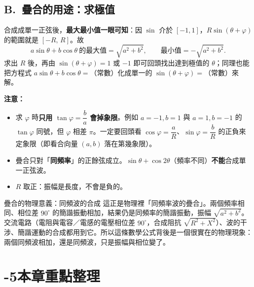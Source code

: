 \documentclass[11pt]{article}
\begin{document}
\subsection*{\sffamily B.\ 疊合的用途：求極值}

合成成單一正弦後，\textbf{最大最小值一眼可知}：因 $\sin$ 介於 $[-1,1]$，$R\sin(\theta+\varphi)$ 的範圍就是 $[-R,\,R]$。故
$$a\sin\theta+b\cos\theta\ \text{的最大值}=\sqrt{a^2+b^2},\qquad\text{最小值}=-\sqrt{a^2+b^2}.$$
求出 $R$ 後，再由 $\sin(\theta+\varphi)=1$ 或 $-1$ 即可回頭找出達到極值的 $\theta$；同理也能把方程式 $a\sin\theta+b\cos\theta=$（常數）化成單一的 $\sin(\theta+\varphi)=$（常數）來解。

\textbf{注意：}
\begin{itemize}\setlength{\itemsep}{1pt}
\item 求 $\varphi$ 時\textbf{只用 $\tan\varphi=\dfrac{b}{a}$ 會掉象限}。例如 $a=-1,b=1$ 與 $a=1,b=-1$ 的 $\tan\varphi$ 同號，但 $\varphi$ 相差 $\pi$。一定要回頭看 $\cos\varphi=\dfrac{a}{R}$、$\sin\varphi=\dfrac{b}{R}$ 的正負來定象限（即看合向量 $(a,b)$ 落在第幾象限）。
\item 疊合只對「\textbf{同頻率}」的正餘弦成立。$\sin\theta+\cos2\theta$（頻率不同）\textbf{不能}合成單一正弦波。
\item $R$ 取正：振幅是長度，不會是負的。
\end{itemize}

\begin{延伸框}{疊合的物理意義：同頻波的合成}
這正是物理裡「同頻率波的疊合」。兩個頻率相同、相位差 $90^\circ$ 的簡諧振動相加，結果仍是同頻率的簡諧振動，振幅 $\sqrt{a^2+b^2}$。交流電路（電阻與電容／電感的電壓相位差 $90^\circ$，合成阻抗 $\sqrt{R^2+X^2}$）、波的干涉、簡諧運動的合成都用到它。所以這條數學公式背後是一個很實在的物理現象：兩個同頻波相加，還是同頻波，只是振幅與相位變了。
\end{延伸框}

\section*{-5\quad 本章重點整理}
\end{document}
